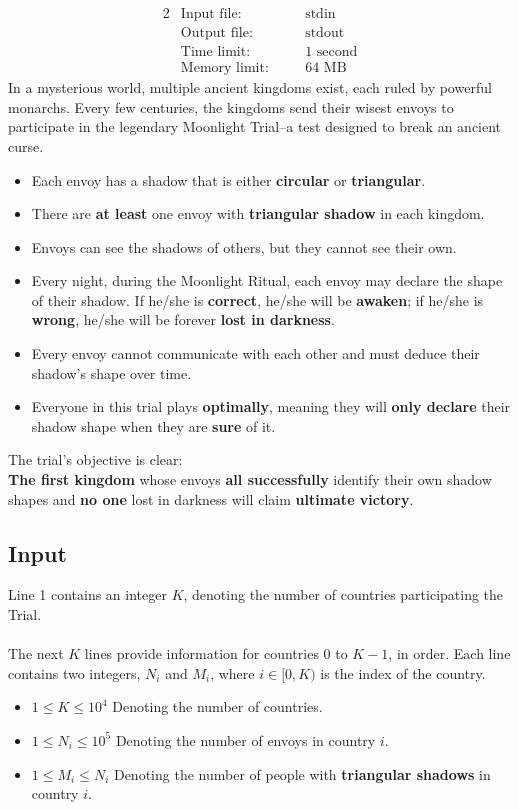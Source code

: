 \documentclass[12pt,a4paper]{article}
\begin{document}
\begin{alignat*} {2}
 &   \text{Input file:}   \quad     &&\text{stdin}\\
 &   \text{Output file:}  \quad     &&\text{stdout}\\
 &   \text{Time limit:}   \quad     &&\text{1 second}\\
 &   \text{Memory limit:} \quad     &&\text{64 MB}
\end{alignat*}
\noindent
In a mysterious world, multiple ancient kingdoms exist, each ruled by powerful monarchs. Every few centuries, the kingdoms send their wisest envoys to participate in the legendary Moonlight Trial--a test designed to break an ancient curse.
\begin{itemize}
    \item Each envoy has a shadow that is either \textbf{circular} or \textbf{triangular}.
    \item There are \textbf{at least} one envoy with \textbf{triangular shadow} in each kingdom.
    \item Envoys can see the shadows of others, but they cannot see their own.
    \item Every night, during the Moonlight Ritual, each envoy may declare the shape of their shadow. If he/she is \textbf{correct}, he/she will be \textbf{awaken}; if he/she is \textbf{wrong}, he/she will be forever \textbf{lost in darkness}.
    \item Every envoy cannot communicate with each other and must deduce their shadow's shape over time.  
    \item Everyone in this trial plays \textbf{optimally}, meaning they will \textbf{only declare} their shadow shape when they are \textbf{sure} of it.
\end{itemize}
\noindent
The trial's objective is clear:
\\
\noindent
\textbf{The first kingdom} whose envoys \textbf{all successfully} identify their own shadow shapes and \textbf{no one} lost in darkness will claim \textbf{ultimate victory}.

\subsection*{\fontsize{16}{12}Input}
Line 1 contains an integer $K$, denoting the number of countries participating the Trial.
\\\\
\noindent
The next \(K\) lines provide information for countries \(0\) to \(K-1\), in order. Each line contains two integers, \(N_i\) and \(M_i\), where \(i \in[0,K)\) is the index of the country.
\begin{itemize}
    \item $1 \leq K \leq 10^4$ Denoting the number of countries.
    \item $1 \leq N_i \leq 10^5$ Denoting the number of envoys in country \(i\).
    \item $1 \leq M_i \leq N_i$ Denoting the number of people with \textbf{triangular shadows} in country \(i\).
\end{itemize}
\end{document}
